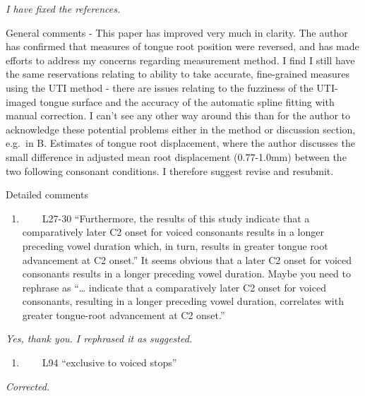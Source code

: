 \documentclass[]{article}
\providecommand{\tightlist}{%
  \setlength{\itemsep}{0pt}\setlength{\parskip}{0pt}}
\begin{document}
\begin{adjustwidth}{1cm}{} \textit{
I have fixed the references.
} \end{adjustwidth}

General comments - This paper has improved very much in clarity. The
author has confirmed that measures of tongue root position were
reversed, and has made efforts to address my concerns regarding
measurement method. I find I still have the same reservations relating
to ability to take accurate, fine-grained measures using the UTI method
- there are issues relating to the fuzziness of the UTI-imaged tongue
surface and the accuracy of the automatic spline fitting with manual
correction. I can't see any other way around this than for the author to
acknowledge these potential problems either in the method or discussion
section, e.g.~in B. Estimates of tongue root displacement, where the
author discusses the small difference in adjusted mean root displacement
(0.77-1.0mm) between the two following consonant conditions. I therefore
suggest revise and resubmit.

Detailed comments

\begin{enumerate}
\def\labelenumi{\arabic{enumi}.}
\tightlist
\item
  ~~~~L27-30 ``Furthermore, the results of this study indicate that a
  comparatively later C2 onset for voiced consonants results in a longer
  preceding vowel duration which, in turn, results in greater tongue
  root advancement at C2 onset.'' It seems obvious that a later C2 onset
  for voiced consonants results in a longer preceding vowel duration.
  Maybe you need to rephrase as ``\ldots{} indicate that a comparatively
  later C2 onset for voiced consonants, resulting in a longer preceding
  vowel duration, correlates with greater tongue-root advancement at C2
  onset.''
\end{enumerate}

\begin{adjustwidth}{1cm}{} \textit{
Yes, thank you. I rephrased it as suggested.
} \end{adjustwidth}

\begin{enumerate}
\def\labelenumi{\arabic{enumi}.}
\setcounter{enumi}{1}
\tightlist
\item
  ~~~~L94 ``exclusive to voiced stops''
\end{enumerate}

\begin{adjustwidth}{1cm}{} \textit{
Corrected.
} \end{adjustwidth}
\end{document}
